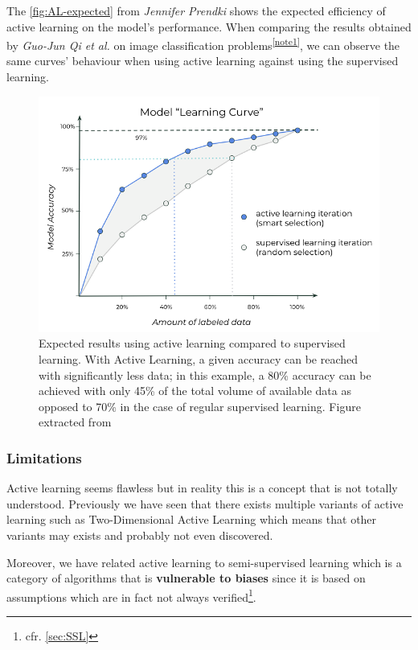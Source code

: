 \documentclass[11pt, openany]{report}
\theoremstyle{plain}
\theoremstyle{definition}
\theoremstyle{remark}
\begin{document}
The \autoref{fig:AL-expected} from \textit{Jennifer Prendki} \cite{AL-kdnuggets} shows the expected efficiency of active learning on the model's performance. When comparing the results obtained by \textit{Guo-Jun Qi et al.} \cite{AL-perf} on image classification problems\textsuperscript{\ref{note1}}, we can observe the same curves' behaviour when using active learning against using the supervised learning.  

\begin{figure}[H]
  \centering
  \includegraphics[scale=1]{figures/AL-expected.png}
  \caption{Expected results using active learning compared to supervised learning. With Active Learning, a given accuracy can be reached with significantly less data; in this example, a 80\% accuracy can be achieved with only 45\% of the total volume of available data as opposed to 70\% in the case of regular supervised learning. Figure extracted from \cite{AL-kdnuggets}}
  \label{fig:AL-expected}
\end{figure}

\subsubsection{Limitations}
Active learning seems flawless but in reality this is a concept that is not totally understood. Previously we have seen that there exists multiple variants of active learning such as Two-Dimensional Active Learning \cite{AL-perf} which means that other variants may exists and probably not even discovered. 

Moreover, we have related active learning to semi-supervised learning which is a category of algorithms that is \textbf{vulnerable to biases} since it is based on assumptions which are in fact not always verified\footnote{cfr. \autoref{sec:SSL}}. %
\end{document}
